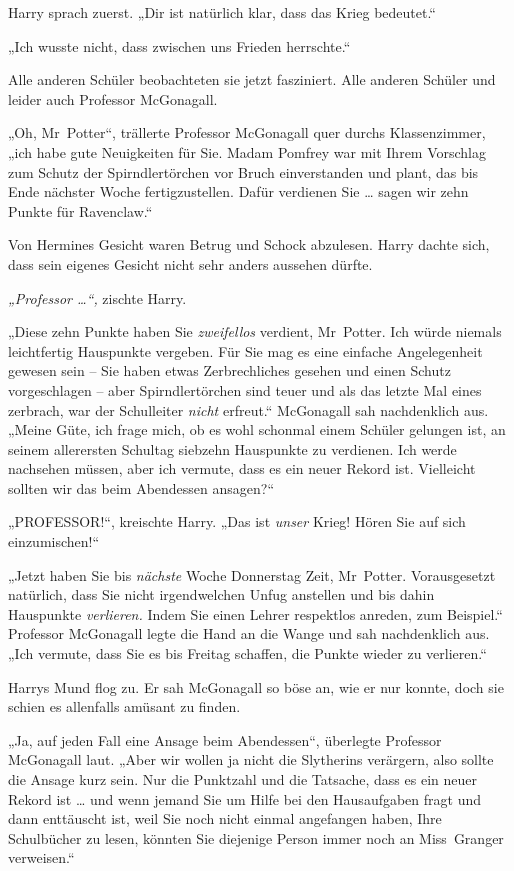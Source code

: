 {Harry sprach zuerst. „Dir ist natürlich klar, dass das Krieg bedeutet.“

„Ich wusste nicht, dass zwischen uns Frieden herrschte.“

Alle anderen Schüler beobachteten sie jetzt fasziniert. Alle anderen Schüler und leider auch Professor McGonagall.

„Oh, Mr~Potter“, trällerte Professor McGonagall quer durchs Klassenzimmer, „ich habe gute Neuigkeiten für Sie. Madam Pomfrey war mit Ihrem Vorschlag zum Schutz der Spirndlertörchen vor Bruch einverstanden und plant, das bis Ende nächster Woche fertigzustellen. Dafür verdienen Sie … sagen wir zehn Punkte für Ravenclaw.“

Von Hermines Gesicht waren Betrug und Schock abzulesen. Harry dachte sich, dass sein eigenes Gesicht nicht sehr anders aussehen dürfte.

\emph{„Professor …“,} zischte Harry.

„Diese zehn Punkte haben Sie \emph{zweifellos} verdient, Mr~Potter. Ich würde niemals leichtfertig Hauspunkte vergeben. Für Sie mag es eine einfache Angelegenheit gewesen sein -- Sie haben etwas Zerbrechliches gesehen und einen Schutz vorgeschlagen -- aber Spirndlertörchen sind teuer und als das letzte Mal eines zerbrach, war der Schulleiter \emph{nicht} erfreut.“ McGonagall sah nachdenklich aus. „Meine Güte, ich frage mich, ob es wohl schonmal einem Schüler gelungen ist, an seinem allerersten Schultag siebzehn Hauspunkte zu verdienen. Ich werde nachsehen müssen, aber ich vermute, dass es ein neuer Rekord ist. Vielleicht sollten wir das beim Abendessen ansagen?“

„PROFESSOR!“, kreischte Harry. „Das ist \emph{unser} Krieg! Hören Sie auf sich einzumischen!“

„Jetzt haben Sie bis \emph{nächste} Woche Donnerstag Zeit, Mr~Potter. Vorausgesetzt natürlich, dass Sie nicht irgendwelchen Unfug anstellen und bis dahin Hauspunkte \emph{verlieren.} Indem Sie einen Lehrer respektlos anreden, zum Beispiel.“ Professor McGonagall legte die Hand an die Wange und sah nachdenklich aus. „Ich vermute, dass Sie es bis Freitag schaffen, die Punkte wieder zu verlieren.“

Harrys Mund flog zu. Er sah McGonagall so böse an, wie er nur konnte, doch sie schien es allenfalls amüsant zu finden.

„Ja, auf jeden Fall eine Ansage beim Abendessen“, überlegte Professor McGonagall laut. „Aber wir wollen ja nicht die Slytherins verärgern, also sollte die Ansage kurz sein. Nur die Punktzahl und die Tatsache, dass es ein neuer Rekord ist … und wenn jemand Sie um Hilfe bei den Hausaufgaben fragt und dann enttäuscht ist, weil Sie noch nicht einmal angefangen haben, Ihre Schulbücher zu lesen, könnten Sie diejenige Person immer noch an Miss~Granger verweisen.“

}
